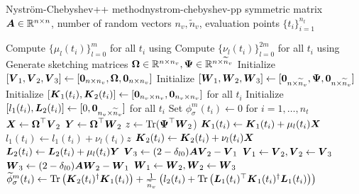 \begin{algo}{Nystr\"om-Chebyshev++ method}{nystrom-chebyshev-pp}
    symmetric matrix $\boldsymbol{A} \in \mathbb{R}^{n \times n}$, number of random vectors $n_v, \widetilde{n}_v$,
    evaluation points $\{t_i\}_{i=1}^{n_t}$
    \begin{algorithmic}[1]
        \State Compute $\{\mu_l(t_i)\}_{l=0}^m$ for all $t_i$ using 
        \State Compute $\{\nu_l(t_i)\}_{l=0}^{2m}$ for all $t_i$ using 
        \State Generate sketching matrices $\boldsymbol{\boldsymbol{\Omega}} \in \mathbb{R}^{n \times n_v}, \boldsymbol{\Psi} \in \mathbb{R}^{n \times \widetilde{n}_v}$ %
        \State Initialize $[\boldsymbol{V}_1, \boldsymbol{V}_2, \boldsymbol{V}_3] \gets [\boldsymbol{0}_{n \times n_v}, \boldsymbol{\boldsymbol{\Omega}}, \boldsymbol{0}_{n \times n_v}]$
        \State Initialize $[\boldsymbol{W}_1, \boldsymbol{W}_2, \boldsymbol{W}_3] \gets [\boldsymbol{0}_{n \times \widetilde{n}_v}, \boldsymbol{\Psi}, \boldsymbol{0}_{n \times \widetilde{n}_v}]$
        \State Initialize $[\boldsymbol{K}_1(t_i), \boldsymbol{K}_2(t_i)] \gets [\boldsymbol{0}_{n_v \times n_v}, \boldsymbol{0}_{n_v \times n_v}]$ for all $t_i$
        \State Initialize $[l_1(t_i), \boldsymbol{L}_2(t_i)] \gets [0, \boldsymbol{0}_{n_v \times \widetilde{n}_v}]$ for all $t_i$
        \State Set ${\phi}_{\sigma}^m(t_i) \gets 0$ for $i=1,\dots,n_t$
          \State $\boldsymbol{X} \gets \boldsymbol{\boldsymbol{\Omega}}^{\top} \boldsymbol{V}_2$
          \State $\boldsymbol{Y} \gets \boldsymbol{\boldsymbol{\Omega}}^{\top} \boldsymbol{W}_2$
          \State $z \gets \operatorname{Tr}(\boldsymbol{\Psi}^{\top} \boldsymbol{W}_2$)
                \State $\boldsymbol{K}_1(t_i) \gets \boldsymbol{K}_1(t_i) + \mu_l(t_i) \boldsymbol{X}$
                \State $l_1(t_i) \gets l_1(t_i) + \nu_l(t_i) z$
            \EndIf
            \State $\boldsymbol{K}_2(t_i) \gets \boldsymbol{K}_2(t_i) + \nu_l(t_i) \boldsymbol{X}$
            \State $\boldsymbol{L}_2(t_i) \gets \boldsymbol{L}_2(t_i) + \mu_l(t_i) \boldsymbol{Y}$
          \EndFor
          \State $\boldsymbol{V}_3 \gets (2 - \delta_{l0}) \boldsymbol{A} \boldsymbol{V}_2 - \boldsymbol{V}_1$ 
          \State $\boldsymbol{V}_1 \gets \boldsymbol{V}_2, \boldsymbol{V}_2 \gets \boldsymbol{V}_3$
          \State $\boldsymbol{W}_3 \gets (2 - \delta_{l0}) \boldsymbol{A} \boldsymbol{W}_2 - \boldsymbol{W}_1$ 
          \State $\boldsymbol{W}_1 \gets \boldsymbol{W}_2, \boldsymbol{W}_2 \gets \boldsymbol{W}_3$
        \EndFor
          \State $\widetilde{\phi}_{\sigma}^m(t_i) \gets \operatorname{Tr}\left( \boldsymbol{K}_2(t_i)^{\dagger}\boldsymbol{K}_1(t_i) \right) + \frac{1}{\widetilde{n}_v} \left( l_2(t_i) + \operatorname{Tr}\left( \boldsymbol{L}_1(t_i)^{\top} \boldsymbol{K}_1(t_i)^{\dagger} \boldsymbol{L}_1(t_i) \right)  \right) $
        \EndFor
    \end{algorithmic}
\end{algo}

